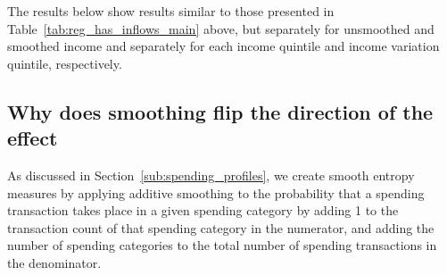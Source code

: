 The results below show results similar to those presented in
Table~\ref{tab:reg_has_inflows_main} above, but separately for unsmoothed and
smoothed income and separately for each income quintile and income variation
quintile, respectively.











\subsection{Why does smoothing flip the direction of the effect}%
\label{sub:why_does_smoothing_flip_the_direction_of_the_effect}

As discussed in Section~\ref{sub:spending_profiles}, we create smooth entropy
measures by applying additive smoothing to the probability that a spending
transaction takes place in a given spending category by adding 1 to the
transaction count of that spending category in the numerator, and adding the
number of spending categories to the total number of spending transactions in
the denominator.


